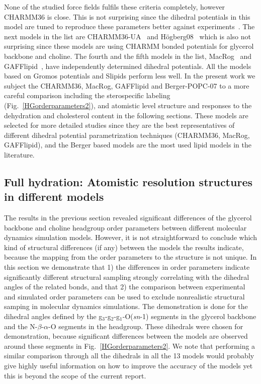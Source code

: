 \documentclass[journal=jpcbfk,manuscript=article]{achemso}
\begin{document}
None of the studied force fields fulfils these criteria completely, however CHARMM36 is close. 
This is not surprising since the dihedral potentials in this model are tuned to reproduce these 
parameters better against experiments~\cite{klauda10}.
The next models in the list are CHARMM36-UA~\cite{henin08,lee14} and H\"ogberg08~\cite{hogberg08} which is also not surprising since
these models are using CHARMM bonded potentials for glycerol backbone and choline. The fourth and the fifth models in the list, MacRog~\cite{maciejewski14} and
GAFFlipid~\cite{dickson12}, have independently determined dihedral potentials. All the models based on Gromos potentials and Slipids perform less well.
In the present work we subject the CHARMM36, MacRog, GAFFlipid and Berger-POPC-07 to a more careful comparison including the sterospecific labeling  
(Fig.~\ref{HGorderparameters2}), and atomistic level structure and responses to the dehydration and cholesterol content in the following sections.
These models are selected for more detailed studies since they are the best representatives of different dihedral potential parametrization techniques 
(CHARMM36, MacRog, GAFFlipid), and the Berger based models are the most used lipid models in the literature.


\subsection{Full hydration: Atomistic resolution structures in different models}

The results in the previous section revealed significant differences of the glycerol backbone and choline headgroup
order parameters between different molecular dynamics simulation models.
However, it is not straightforward to conclude which kind of structural differences (if any)
between the models the results indicate, because the mapping from the order parameters to the 
structure is not unique. In this section we demonstrate that 1) the differences in order parameters
indicate significantly different structural sampling strongly correlating with the dihedral angles of the related bonds,
and that 2) the comparison between experimental and simulated order parameters can be used to exclude
nonrealistic structural samping in molecular dynamics simulations. The demonstration is done for 
the dihedral angles defined by the g$_3$-g$_2$-g$_1$-O(\textit{sn}-1) segments in the glycerol backbone and 
the N-$\beta$-$\alpha$-O segments in the headgroup. These dihedrals were chosen for demonstration, because 
significant differences between the models are observed around these segments in Fig.~\ref{HGorderparameters2}.
We note that performing a similar comparison through all the dihedrals in all the 13 models would probably give highly useful
information on how to improve the accuracy of the models yet this is beyond the scope of the current report. 
\end{document}

